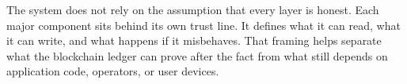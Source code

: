 %

The system does not rely on the assumption that every layer is honest. Each major component sits behind its own trust line. It defines what it can read, what it can write, and what happens if it misbehaves. That framing helps separate what the blockchain ledger can prove after the fact from what still depends on application code, operators, or user devices.

